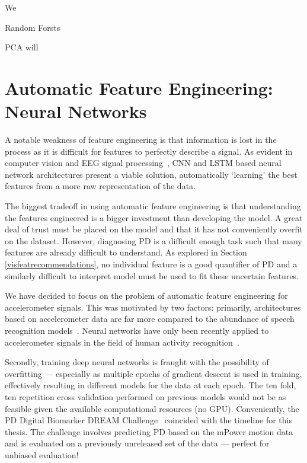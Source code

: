 \documentclass[12pt, twoside]{book}
\begin{document}
We 

Random Forsts 

PCA will 



\section{Automatic Feature Engineering: Neural Networks}
\label{automaticfeatureengineering}
A notable weakness of feature engineering is that information is lost in the process as it is difficult for features to perfectly describe a signal. As evident in computer vision and EEG signal processing~\cite{bashivan2015learning}, CNN and LSTM based neural network architectures present a viable solution, automatically `learning' the best features from a more raw representation of the data. 

The biggest tradeoff in using automatic feature engineering is that understanding the features engineered is a bigger investment than developing the model. A great deal of trust must be placed on the model and that it has not conveniently overfit on the dataset. However, diagnosing PD is a difficult enough task such that many features are already difficult to understand. As explored in Section \ref{visfeatrecommendations}, no individual feature is a good quantifier of PD and a similarly difficult to interpret model must be used to fit these uncertain features.

We have decided to focus on the problem of automatic feature engineering for accelerometer signals. This was motivated by two factors: primarily, architectures based on accelerometer data are far more compared to the abundance of speech recognition models~\cite{convlstm, wavenet}. Neural networks have only been recently applied to accelerometer signals in the field of human activity recognition~\cite{deepconvlstm}.  

Secondly, training deep neural networks is fraught with the possibility of overfitting --- especially as multiple epochs of gradient descent is used in training, effectively resulting in different models for the data at each epoch. The ten fold, ten repetition cross validation performed on previous models would not be as feasible given the available computational resources (no GPU). Conveniently, the PD Digital Biomarker DREAM Challenge~\cite{dreamchallengeinfo} coincided with the timeline for this thesis. The challenge involves predicting PD based on the mPower motion data and is evaluated on a previously unreleased set of the data --- perfect for unbiased evaluation!
\end{document}
